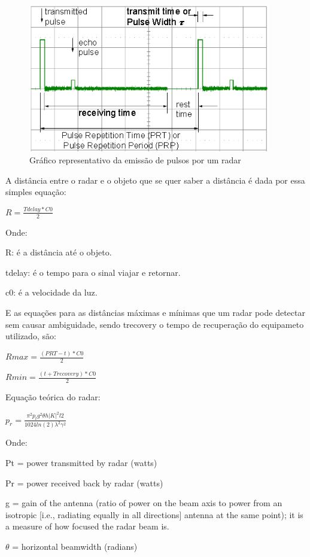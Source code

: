 \begin{figure}[h]
  \centering
  \includegraphics[width=400px, scale=1]{figuras/emissao_pulsos_radar}
  \caption{Gráfico representativo da emissão de pulsos por um radar}
\label{fig:emissao_pulsos_radar}
\end{figure}

A distância entre o radar e o objeto que se quer saber a distância é dada por essa simples equação:

$ R = \displaystyle\frac{Tdelay * C0}{2}$

Onde:

	R: é a distância até o objeto.

	tdelay: é o tempo para o sinal viajar e retornar.

	c0: é a velocidade da luz.

  E as equações para as distâncias máximas e mínimas que um radar pode detectar sem
  causar ambiguidade, sendo trecovery o tempo de recuperação do equipameto
   utilizado, são:


$ Rmax = \frac{(PRT - t) * C0}{2}$

$ Rmin = \frac{(t + Trecovery) * C0}{2}$




Equação teórica do radar:

$p_{r} = \frac{\pi ^{2}p_{t}g^{2}\theta h |K|^{2}l2}{1024ln(2)\lambda ^{2}\gamma ^{2}}$

Onde:

Pt = power transmitted by radar (watts)

Pr = power received back by radar (watts)

g = gain of the antenna (ratio of power on the beam axis to power from an isotropic [i.e.,
radiating equally in all directions] antenna at the same point); it is a measure
of how focused the radar beam is.

$\theta$ = horizontal beamwidth (radians)

